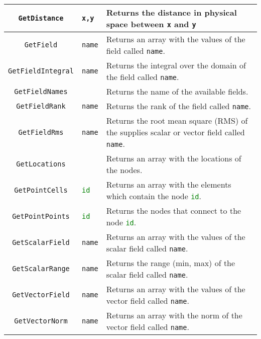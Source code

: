 \begin{landscape}
\begin{longtable}{|c | p{} |p{}|}
%
\lstinline[language=Python]+GetDistance+ & \lstinline[language=Python]+x,y+ & Returns the distance in physical space between \lstinline[language=Python]+x+ and \lstinline[language=Python]+y+ \\ \hline
%
\lstinline[language=Python]+GetField+ & \lstinline[language=Python]+name+ & Returns an array with the values of the field called \lstinline[language=Python]+name+. \\ \hline
%
\lstinline[language=Python]+GetFieldIntegral+ & \lstinline[language=Python]+name+ & Returns the integral over the domain of the field called \lstinline[language=Python]+name+. \\ \hline
%
\lstinline[language=Python]+GetFieldNames+ & & Returns the name of the available fields. \\ \hline
%
\lstinline[language=Python]+GetFieldRank+ & \lstinline[language=Python]+name+ & Returns the rank of the field called \lstinline[language=Python]+name+. \\ \hline
%
\lstinline[language=Python]+GetFieldRms+ & \lstinline[language=Python]+name+ & Returns the root mean square (RMS) of the supplies scalar or vector field called \lstinline[language=Python]+name+. \\ \hline
%
\lstinline[language=Python]+GetLocations+ & & Returns an array with the locations of the nodes. \\ \hline
%
\lstinline[language=Python]+GetPointCells+ & \lstinline[language=Python]+id+ & Returns an array with the elements which contain the node \lstinline[language=Python]+id+. \\ \hline
%
\lstinline[language=Python]+GetPointPoints+ & \lstinline[language=Python]+id+ & Returns the nodes that connect to the node \lstinline[language=Python]+id+. \\ \hline
%
\lstinline[language=Python]+GetScalarField+ & \lstinline[language=Python]+name+ & Returns an array with the values of the scalar field called \lstinline[language=Python]+name+. \\ \hline
%
\lstinline[language=Python]+GetScalarRange+ & \lstinline[language=Python]+name+ & Returns the range (min, max) of the scalar field called \lstinline[language=Python]+name+. \\ \hline
\lstinline[language=Python]+GetVectorField+ & \lstinline[language=Python]+name+ & Returns an array with the values of the vector field called \lstinline[language=Python]+name+. \\ \hline
%
\lstinline[language=Python]+GetVectorNorm+ & \lstinline[language=Python]+name+ & Returns an array with the norm of the vector field called \lstinline[language=Python]+name+. \\ \hline

\end{longtable}
\end{landscape}
